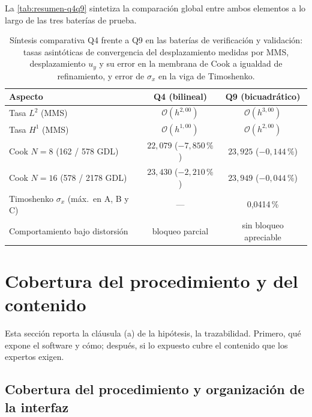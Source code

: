 La \autoref{tab:resumen-q4q9} sintetiza la comparación global entre ambos elementos a lo largo de las tres baterías de prueba.

\begin{table}[htbp]
\centering
\caption[Síntesis comparativa Q4 frente a Q9 en las baterías de verificación y validación.]{Síntesis comparativa Q4 frente a Q9 en las baterías de verificación y validación: tasas asintóticas de convergencia del desplazamiento medidas por MMS, desplazamiento $u_y$ y su error en la membrana de Cook a igualdad de refinamiento, y error de $\sigma_x$ en la viga de Timoshenko.}
\label{tab:resumen-q4q9}
\begin{tabular}{l c c}
\hline
Aspecto & Q4 (bilineal) & Q9 (bicuadrático) \\
\hline
Tasa $L^2$ (MMS)              & $\mathcal{O}(h^{2{,}00})$ & $\mathcal{O}(h^{3{,}00})$ \\
Tasa $H^1$ (MMS)              & $\mathcal{O}(h^{1{,}00})$ & $\mathcal{O}(h^{2{,}00})$ \\
Cook $N=8$ (162 / 578 GDL)    & $22{,}079$ ($-7{,}850\,\%$) & $23{,}925$ ($-0{,}144\,\%$) \\
Cook $N=16$ (578 / 2178 GDL)  & $23{,}430$ ($-2{,}210\,\%$) & $23{,}949$ ($-0{,}044\,\%$) \\
Timoshenko $\sigma_x$ (máx.\ en A, B y C) & --- & 0,0414\,\% \\
Comportamiento bajo distorsión & bloqueo parcial & sin bloqueo apreciable \\
\hline
\end{tabular}
{\singlespacing{}}
\end{table}

\section{Cobertura del procedimiento y del contenido}
\label{sec:cobertura}

Esta sección reporta la cláusula (a) de la hipótesis, la trazabilidad. Primero, qué expone el software y cómo; después, si lo expuesto cubre el contenido que los expertos exigen.

\subsection{Cobertura del procedimiento y organización de la interfaz}
\label{sec:cobertura-canal}

